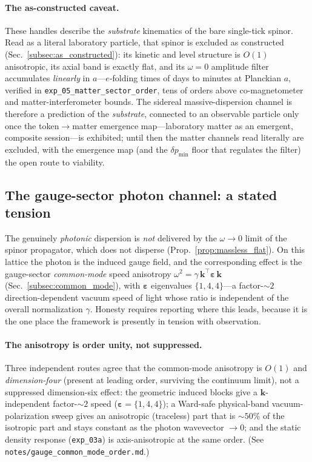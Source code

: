 \paragraph{The as-constructed caveat.} These handles describe the \emph{substrate}
kinematics of the bare single-tick spinor. Read as a literal laboratory particle, that
spinor is excluded as constructed (Sec.~\ref{subsec:as_constructed}): its kinetic and
level structure is $O(1)$ anisotropic, its axial band is exactly flat, and its $\omega=0$
amplitude filter accumulates \emph{linearly} in $a$---$e$-folding times of days to minutes
at Planckian $a$, verified in \texttt{exp\_05\_matter\_sector\_order}, tens of orders above
co-magnetometer and matter-interferometer bounds. The sidereal massive-dispersion channel
is therefore a prediction of the \emph{substrate}, connected to an observable particle only
once the token$\to$matter emergence map---laboratory matter as an emergent, composite
session---is exhibited; until then the matter channels read literally are excluded, with the
emergence map (and the $\delta p_\text{min}$ floor that regulates the filter) the open route
to viability.

\subsection{The gauge-sector photon channel: a stated tension}
\label{subsec:gauge_channel}

The genuinely \emph{photonic} dispersion is \emph{not} delivered by the $\omega\to0$
limit of the spinor propagator, which does not disperse (Prop.~\ref{prop:massless_flat}).
On this lattice the photon is the induced gauge field, and the corresponding effect is
the gauge-sector \emph{common-mode} speed anisotropy $\omega^2 =
\gamma\,\mathbf{k}^{\!\top}\boldsymbol{\varepsilon}\,\mathbf{k}$
(Sec.~\ref{subsec:common_mode}), with $\boldsymbol{\varepsilon}$ eigenvalues
$\{1,4,4\}$---a factor-$\sim2$ direction-dependent vacuum speed of light whose ratio is
independent of the overall normalization $\gamma$. Honesty requires reporting where this leads,
because it is the one place the framework is presently in tension with observation.

\paragraph{The anisotropy is order unity, not suppressed.} Three independent routes
agree that the common-mode anisotropy is $O(1)$ and \emph{dimension-four} (present at
leading order, surviving the continuum limit), not a suppressed dimension-six effect:
the geometric induced blocks give a $\mathbf{k}$-independent factor-$\sim2$ speed
($\boldsymbol{\varepsilon}=\{1,4,4\}$); a Ward-safe physical-band vacuum-polarization
sweep gives an anisotropic (traceless) part that is $\sim\!50\%$ of the isotropic part
and stays constant as the photon wavevector $\to0$; and the static density response
(\texttt{exp\_03a}) is axis-anisotropic at the same order. (See
\texttt{notes/gauge\_common\_mode\_order.md}.)


